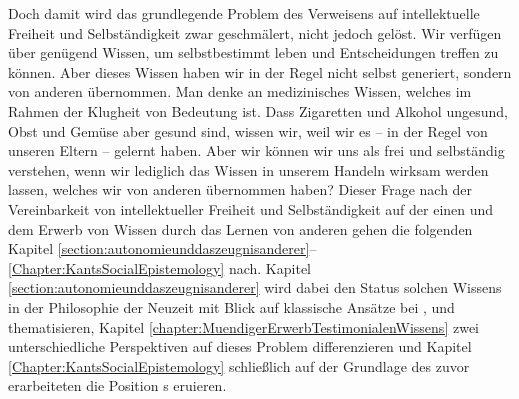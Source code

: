 Doch damit wird das grundlegende Problem des Verweisens auf intellektuelle
Freiheit und Selbständigkeit zwar geschmälert, nicht jedoch gelöst. Wir
verfügen über genügend Wissen, um selbstbestimmt leben und Entscheidungen
treffen zu können. Aber dieses Wissen haben wir in der Regel nicht selbst
generiert, sondern von anderen übernommen. Man denke an medizinisches Wissen,
welches im Rahmen der Klugheit von Bedeutung ist. Dass Zigaretten und Alkohol
ungesund, Obst und Gemüse aber gesund sind, wissen wir, weil wir es -- in der
Regel von unseren Eltern -- gelernt haben. Aber wir können wir uns als frei und
selbständig verstehen, wenn wir lediglich das Wissen in unserem Handeln wirksam
werden lassen, welches wir von anderen übernommen haben? Dieser Frage nach der
Vereinbarkeit von intellektueller Freiheit und Selbständigkeit auf der einen und
dem Erwerb von Wissen durch das Lernen von anderen gehen die folgenden Kapitel
\ref{section:autonomieunddaszeugnisanderer}--\ref{Chapter:KantsSocialEpistemology}
nach. Kapitel \ref{section:autonomieunddaszeugnisanderer} wird dabei den Status
solchen Wissens in der Philosophie der Neuzeit mit Blick auf klassische Ansätze
bei  ,  und
thematisieren, Kapitel \ref{chapter:MuendigerErwerbTestimonialenWissens} zwei
unterschiedliche Perspektiven auf dieses Problem differenzieren und Kapitel
\ref{Chapter:KantsSocialEpistemology} schließlich auf der Grundlage des zuvor
erarbeiteten die Position s eruieren.


